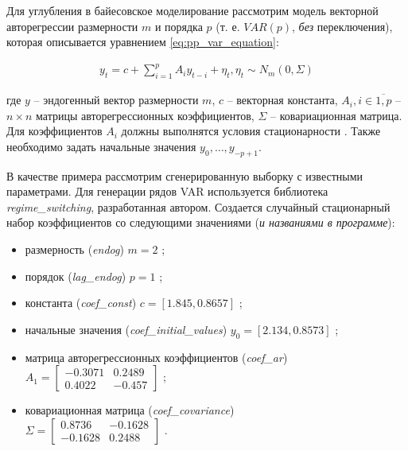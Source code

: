 \documentclass[a4paper,14pt]{extreport}
\begin{document}
\label{subsection:var}

Для углубления в байесовское моделирование рассмотрим модель векторной авторегрессии размерности $m$ и порядка $p$ (т. е. $VAR(p)$, \textit{без} переключения), которая описывается уравнением \eqref{eq:pp_var_equation}:

\begin{equation}
	\begin{multlined}
		y_t = c + \sum\limits_{i=1}^{p}{A_{i}y_{t-i}} + \eta_t , 
		\eta_t \sim N_m(0, \Sigma)
	\end{multlined}
	\label{eq:pp_var_equation}
\end{equation}

\noindent
где $y$ -- эндогенный вектор размерности $m$, $c$ -- векторная константа, $A_i, i\in\overline{1,p}$ -- $n \times n$ матрицы авторегрессионных коэффициентов, $\Sigma$ -- ковариационная матрица. Для коэффициентов $A_i$ должны выполнятся условия стационарности \cite{mal_multidim_nonhomogenous}. Также необходимо задать начальные значения ${y_{0}, \dots, y_{-p+1}}$. 

В качестве примера рассмотрим сгенерированную выборку с известными параметрами. Для генерации рядов VAR используется библиотека \textit{regime\_switching}, разработанная автором. Создается случайный стационарный набор коэффициентов со следующими значениями (\textit{и названиями в программе}):

\begin{itemize}
	\item размерность (\textit{endog}) $m=2$ ;
	\item порядок (\textit{lag\_endog}) $p=1$ ;
	\item константа (\textit{coef\_const}) $c=[1.845, 0.8657]$ ;
	\item начальные значения (\textit{coef\_initial\_values}) $y_0=[2.134, 0.8573]$ ;
	\item матрица авторегрессионных коэффициентов (\textit{coef\_ar}) \\ $ A_1 = \begin{bmatrix} -0.3071 & 0.2489 \\ 0.4022 & -0.457 \end{bmatrix} $ ;
	\item ковариационная матрица (\textit{coef\_covariance}) \\ $ \Sigma = \begin{bmatrix} 0.8736 & -0.1628 \\ -0.1628 & 0.2488 \end{bmatrix} $ .
\end{itemize}
\end{document}
